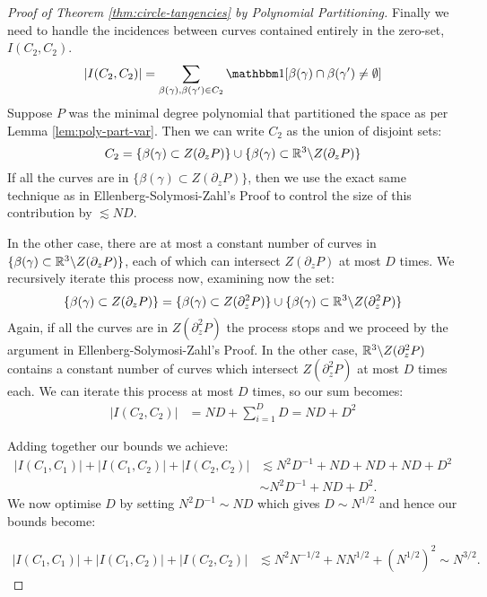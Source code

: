 \begin{proof}[Proof of Theorem \ref{thm:circle-tangencies} by Polynomial Partitioning]
Finally we need to handle the incidences between curves contained entirely in the zero-set, $I(C_2,C_2)$. 
\[
    |I(C_2,C_2)| = \sum_{\beta(\gamma), \beta(\gamma') \in C_2} \OO[\beta(\gamma) \cap \beta(\gamma') \neq \emptyset]
\]
Suppose $P$ was the minimal degree polynomial that partitioned the space as per Lemma \ref{lem:poly-part-var}. Then we can write $C_2$ as the union of disjoint sets:
\[
C_2 = \{\beta(\gamma) \subset Z(\partial_z P)\} \cup \{\beta(\gamma) \subset \mathbb R^3 \backslash Z(\partial_z P)\}
\]
If all the curves are in $\{\beta(\gamma) \subset Z(\partial_z P)\}$, then we use the exact same technique as in Ellenberg-Solymosi-Zahl's Proof to control the size of this contribution by $\lesssim ND$.

In the other case, there are at most a constant number of curves in $\{\beta(\gamma) \subset \mathbb R^3 \backslash Z(\partial_z P)\}$, each of which can intersect $ Z(\partial_z P)$ at most $D$ times. 
We recursively iterate this process now, examining now the set: 
\[\{\beta(\gamma) \subset Z(\partial_z P)\} = \{\beta(\gamma) \subset Z(\partial^2_z P)\} \cup \{\beta(\gamma) \subset \mathbb R^3 \backslash Z(\partial^2_z P)\}\]
Again, if all the curves are in $Z(\partial^2_z P)$ the process stops and we proceed by the argument in Ellenberg-Solymosi-Zahl's Proof. In the other case, $\mathbb R^3 \backslash Z(\partial^2_z P)$
contains a constant number of curves which intersect $ Z(\partial^2_z P)$ at most $D$ times each. We can iterate this process at most $D$ times, so our sum becomes:
\begin{align*}
    |I(C_2,C_2)| &= ND + \sum_{i=1}^D D = ND + D^2
\end{align*}

Adding together our bounds we achieve:
\begin{align*}
    |I(C_1,C_1)|+|I(C_1,C_2)|+|I(C_2,C_2)| &\lesssim N^2D^{-1} + ND + ND + ND + D^2 \\
    &\sim N^2D^{-1} + ND + D^2.
\end{align*}
We now optimise $D$ by setting $N^2D^{-1} \sim ND$ which gives $D \sim N^{1/2}$ and hence our bounds become:

\begin{align*}
    |I(C_1,C_1)|+|I(C_1,C_2)|+|I(C_2,C_2)| &\lesssim N^2N^{-1/2} + NN^{1/2} + (N^{1/2})^2 \sim N^{3/2}.
\end{align*}

    
\end{proof}